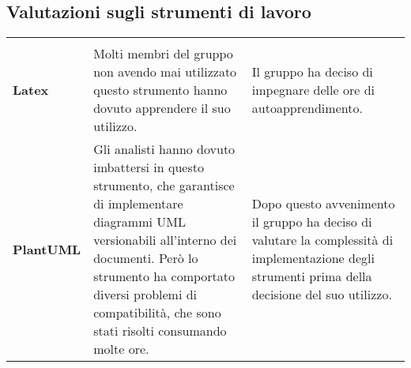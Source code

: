 \documentclass[../piano-di-qualifica.tex]{subfiles}
\begin{document}
 \newpage
  \subsection{Valutazioni sugli strumenti di lavoro}


  \begin{longtable}[H]{>{\centering\bfseries}m{4cm} >{\centering\arraybackslash}m{6cm} >{\centering\arraybackslash}m{6cm}}
    \rowcolor{darkgray!90!}
    \color{white}{\textbf{Strumento}} & \color{white}{\textbf{Descrizione}} & \color{white}{\textbf{Soluzione}} \\
    Latex & Molti membri del gruppo non avendo mai utilizzato questo strumento hanno dovuto apprendere il suo utilizzo. & Il gruppo ha deciso di impegnare delle ore di autoapprendimento. \\
    PlantUML & Gli analisti hanno dovuto imbattersi in questo strumento, che garantisce di implementare diagrammi UML versionabili all'interno dei documenti. Però lo strumento ha comportato diversi problemi di compatibilità, che sono stati risolti consumando molte ore. & Dopo questo avvenimento il gruppo ha deciso di valutare la complessità di implementazione degli strumenti prima della decisione del suo utilizzo. \\
     \end{longtable}
\end{document}
